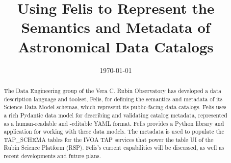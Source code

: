 \documentclass[11pt,twoside]{article}
\begin{document}

\date{\today}
\title{Using Felis to Represent the Semantics and Metadata of Astronomical Data Catalogs}



\begin{abstract}
    The Data Engineering group of the Vera C. Rubin Observatory has developed a data description language and toolset, Felis, for defining the semantics and metadata of its Science Data Model schemas, which represent its public-facing data catalogs. Felis uses a rich Pydantic data model for describing and validating catalog metadata, represented as a human-readable and -editable YAML format. Felis provides a Python library and application for working with these data models. The metadata is used to populate the TAP\_SCHEMA tables for the IVOA TAP services that power the table UI of the Rubin Science Platform (RSP). Felis's current capabilities will be discussed, as well as recent developments and future plans.
\end{abstract}


\end{document}
